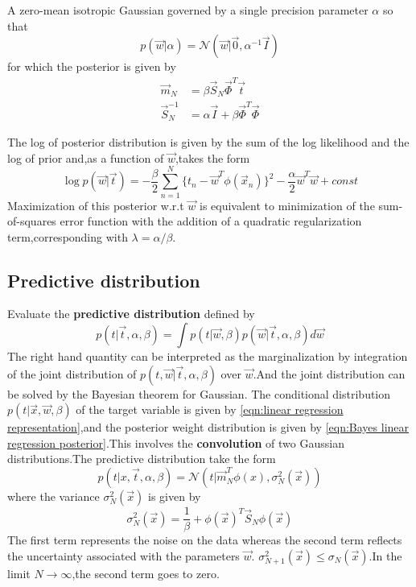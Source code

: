 A zero-mean isotropic Gaussian governed by a single precision parameter $\alpha$ so that
\begin{equation}
p(\vec{w}|\alpha) = \mathcal{N}(\vec{w}|\vec{0},\alpha^{-1}\vec{I})
\end{equation}
for which the posterior is given by
\begin{align}
\vec{m}_N &=\beta\vec{S}_N\vec{\Phi}^T\vec{t} \\
\vec{S}_N^{-1}&=\alpha\vec{I}+\beta\vec{\Phi}^T\vec{\Phi}
\end{align}

The log of posterior distribution is given by the sum of the log likelihood and the log of prior and,as a function of $\vec{w}$,takes the form
\begin{equation}
\log p(\vec{w}|\vec{t}) = 
-\dfrac{\beta}{2}\sum_{n=1}^{N}\{t_n-\vec{w}^T\phi(\vec{x}_n) \}^2-\dfrac{\alpha}{2}\vec{w}^T\vec{w}+const
\end{equation}
Maximization of this posterior w.r.t $\vec{w}$ is equivalent to minimization of the sum-of-squares error function with the addition of a quadratic regularization term,corresponding with $\lambda=\alpha/\beta$.



\subsection{Predictive distribution}
Evaluate the \textbf{predictive distribution} defined by
\begin{equation}
p(t|\vec{t},\alpha,\beta) = \int p(t|\vec{w},\beta)p(\vec{w}|\vec{t},\alpha,\beta)d\vec{w}
\end{equation}
The right hand quantity can be interpreted as the marginalization by integration of the joint distribution of $p(t,\vec{w}|\vec{t},\alpha,\beta)$ over $\vec{w}$.And the joint distribution can be solved by the Bayesian theorem for Gaussian.
The conditional distribution $p(t|\vec{x},\vec{w},\beta)$ of the target variable is given by \ref{eqn:linear regression representation},and the posterior weight distribution is given by \ref{eqn:Bayes linear regression posterior}.This involves the \textbf{convolution} of two Gaussian distributions.The predictive distribution take the form
\begin{equation}
p(t|x,\vec{t},\alpha,\beta) = \mathcal{N}(t|\vec{m}_N^T\phi(x),\sigma_N^2(\vec{x}))
\end{equation}
where the variance $\sigma_N^2(\vec{x})$ is given by
\begin{equation}
\sigma_N^2(\vec{x})=\dfrac{1}{\beta}+\phi(\vec{x})^T\vec{S}_N\phi(\vec{x})
\end{equation}
The first term represents the noise on the data whereas the second term reflects the uncertainty associated with the parameters $\vec{w}$.
$\sigma_{N+1}^2(\vec{x})\leq \sigma_N(\vec{x})$.In the limit $N\rightarrow \infty$,the second term goes to zero.


